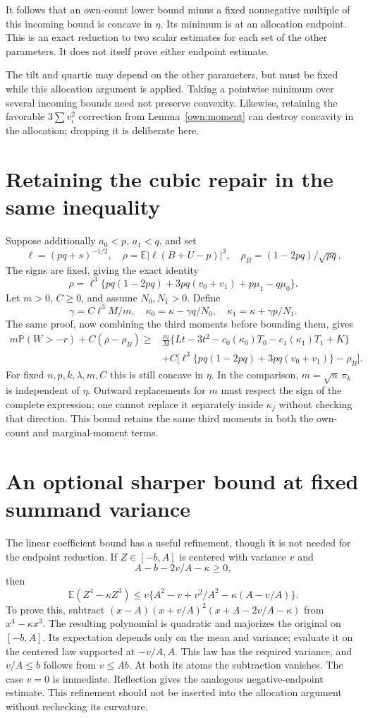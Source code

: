 \documentclass[11pt]{article}
\newcommand{\E}{\mathbb E}
\newcommand{\Pp}{\mathbb P}
\begin{document}
It follows that an own-count lower bound minus a fixed nonnegative
multiple of this incoming bound is concave in $\eta$. Its minimum is
at an allocation endpoint. This is an exact reduction to two scalar
estimates for each set of the other parameters. It does not itself
prove either endpoint estimate.

The tilt and quartic may depend on the other parameters, but must be
fixed while this allocation argument is applied. Taking a pointwise
minimum over several incoming bounds need not preserve convexity.
Likewise, retaining the favorable $3\sum v_i^2$ correction from
Lemma~\ref{own:moment} can destroy concavity in the allocation; dropping
it is deliberate here.

\section*{Retaining the cubic repair in the same inequality}
Suppose additionally $a_0<p$, $a_1<q$, and set
\[
 \ell=(pq+s)^{-1/2},\quad \rho=\E|\ell(B+U-p)|^3,
 \quad \rho_B=(1-2pq)/\sqrt{pq}.
\]
The signs are fixed, giving the exact identity
\[
 \rho=\ell^3\{pq(1-2pq)+3pq(v_0+v_1)+p\mu_1-q\mu_0\}.
\]
Let $m>0$, $C\ge0$, and assume $N_0,N_1>0$. Define
\[
 \gamma=C\ell^3M/m,\quad
 \kappa_0=\kappa-\gamma q/N_0,\quad
 \kappa_1=\kappa+\gamma p/N_1.
\]
The same proof, now combining the third moments before bounding them,
gives
\begin{align*}
 m\Pp(W>-r)+C(\rho-\rho_B)\ge{}&
 \frac mM\{Lt-3t^2-c_0(\kappa_0)T_0-c_1(\kappa_1)T_1+K\}\\
 &+C\bigl[\ell^3\{pq(1-2pq)+3pq(v_0+v_1)\}-\rho_B\bigr].
\end{align*}
For fixed $n,p,k,\lambda,m,C$ this is still concave in $\eta$.
In the comparison, $m=\sqrt n\,\pi_k$ is independent of $\eta$.
Outward replacements for $m$ must respect the sign of the complete
expression; one cannot replace it separately inside $\kappa_j$ without
checking that direction. This bound retains the same third moments in
both the own-count and marginal-moment terms.

\section*{An optional sharper bound at fixed summand variance}
The linear coefficient bound has a useful refinement, though it is not
needed for the endpoint reduction. If $Z\in[-b,A]$ is centered with
variance $v$ and
\[
                   A-b-2v/A-\kappa\ge0,
\]
then
\[
 \E(Z^4-\kappa Z^3)
 \le v\{A^2-v+v^2/A^2-\kappa(A-v/A)\}.
\]
To prove this, subtract
$(x-A)(x+v/A)^2(x+A-2v/A-\kappa)$ from $x^4-\kappa x^3$.
The resulting polynomial is quadratic and majorizes the original on
$[-b,A]$. Its expectation depends only on the mean and variance; evaluate
it on the centered law supported at $-v/A,A$. This law has the required
variance, and $v/A\le b$ follows from $v\le Ab$. At both its atoms
the subtraction vanishes. The case $v=0$ is immediate. Reflection
gives the analogous negative-endpoint estimate. This refinement should
not be inserted into the allocation argument without rechecking its
curvature.
\end{document}
